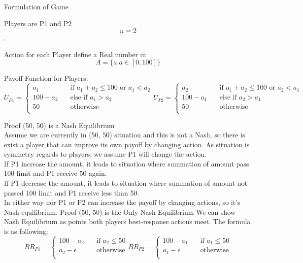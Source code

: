 \documentclass[
  course = {{IE579 Game Theory and Multi-Agent Reinforcement Learning}},
  assignment = 1,
  name = {{Mohammad Mahdi Rahimi}},
  studentnumber = {{20208244}},
  email = {{mahi@kaist.ac.kr}},
  firstexercise = 1
]{aga-homework}
\begin{document}
\exercise
\subexercise Formulation of Game

Players are P1 and P2\[ n = 2\].

Action for each Player define a Real number in \[A = \{ a | a \in [0,100] \}\]

Payoff Function for Players:
\[ U_{P1} = 
     \begin{cases}
       a_1 &\quad\text{if }a_1 + a_2 \le 100 \text{ or } a_1 < a_2\\
       100 - a_2 &\quad\text{else if } a_1 > a_2 \\
       50 &\quad\text{otherwise}\\ 
     \end{cases}
     U_{P2} = 
     \begin{cases}
       a_2 &\quad\text{if }a_1 + a_2 \le 100 \text{ or } a_2 < a_1\\
       100 - a_1 &\quad\text{else if } a_2 > a_1 \\
       50 &\quad\text{otherwise}\\ 
     \end{cases}
\]

\subexercise Proof (50, 50) is a Nash Equilibrium
\\

Assume we are currently in (50, 50) situation and this is not a Nash, so there is exist a player that can improve its own payoff by changing action.
As situation is symmetry regards to players, we assume P1 will change the action.
\\

If P1 increase the amount, it leads to situation where summation of amount pass 100 limit and P1 receive 50 again. 
\\

If P1 decrease the amount, it leads to situation where summation of amount not passed 100 limit and P1 receive less than 50.
\\

In either way nor P1 or P2 can increase the payoff by changing actions, so it's Nash equilibrium.
\subexercise Proof (50, 50) is the Only Nash Equilibrium
We can show Nash Equilibrium as points both players best-response actions meet.
The formula is as following:
\[ BR_{P1} = 
     \begin{cases}
       100 - a_2 &\quad\text{if } a_2 \le 50\\
       a_2 - \epsilon &\quad\text{otherwise}\\ 
     \end{cases}
     BR_{P2} = 
     \begin{cases}
       100 - a_1 &\quad\text{if } a_1 \le 50\\
       a_1 - \epsilon &\quad\text{otherwise}\\ 
     \end{cases}
\]
\end{document}
